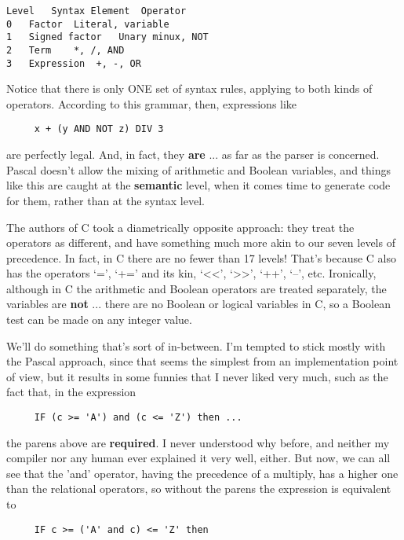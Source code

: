 \begin{verbatim}
Level	Syntax Element	Operator
0	Factor	Literal, variable
1	Signed factor	Unary minux, NOT
2	Term	*, /, AND
3	Expression	+, -, OR
\end{verbatim}

Notice that there is only ONE set of syntax  rules, applying  to both  kinds  of  operators. According to this  grammar, then, expressions like

\begin{verbatim}
     x + (y AND NOT z) DIV 3
\end{verbatim}

are perfectly legal. And, in  fact, they {\bfseries are} ... as far as the parser  is  concerned. Pascal  doesn't  allow  the  mixing  of arithmetic and Boolean variables, and things like this are caught at the {\bfseries semantic} level, when it comes time to  generate  code  for them, rather than at the syntax level.

The authors of C took  a  diametrically  opposite  approach: they treat the operators as  different, and  have something much more akin  to our seven levels of precedence. In fact, in C there are no fewer than 17 levels!  That's because C also has the operators `=', `+=' and its kin, `<<', `>>', `++', `--', etc. Ironically, although in C the  arithmetic  and  Boolean operators are treated separately, the variables are {\bfseries not}  ... there  are no Boolean or logical variables in  C, so  a  Boolean  test can be made on any integer value.

We'll do something that's  sort  of  in-between. I'm tempted to stick  mostly  with  the Pascal approach, since  that  seems  the simplest from an implementation point  of view, but it results in some funnies that I never liked very much, such as the fact that, in the expression

\begin{verbatim}
     IF (c >= 'A') and (c <= 'Z') then ...
\end{verbatim}

the  parens  above  are {\bfseries required}. I never understood why before, and  neither my compiler nor any human  ever  explained  it  very well, either. But now, we  can  all see that the 'and' operator, having the precedence of a multiply, has a higher  one  than  the relational operators, so without  the  parens  the  expression is equivalent to

\begin{verbatim}
     IF c >= ('A' and c) <= 'Z' then
\end{verbatim}

